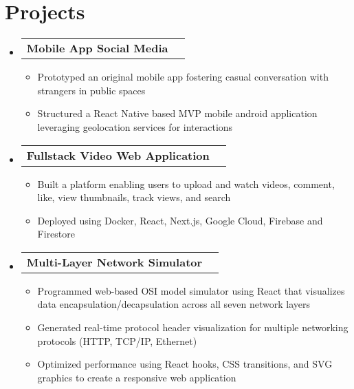 \documentclass[letterpaper,11pt]{article}
\makeatletter
\newcommand{\resumeItem}[1]{
  \item\small{#1}
    {\vspace{-2pt}}
  }
\newcommand{\resumeSubheading}[4]{
  \vspace{-2pt}\item
    \begin{tabular*}{0.97\textwidth}[t]{l@{\extracolsep{\fill}}r}
      \vspace{0pt}
      \textbf{\small#1} & \small#2 \\
      \vspace{0pt}
      \textit{\small#3} & \textit{\small #4} \\
    \end{tabular*}\vspace{-2pt}
}
\newcommand{\resumeProjectHeading}[2]{
    \item
    \begin{tabular*}{0.97\textwidth}{l@{\extracolsep{\fill}}r}
      \small#1 & \small#2 \\
    \end{tabular*}\vspace{-7pt}
}
\newcommand{\resumeSubHeadingListStart}{\begin{itemize}[leftmargin=0.15in, label={}]}
\newcommand{\resumeSubHeadingListEnd}{\end{itemize}}
\newcommand{\resumeItemListStart}{\begin{itemize}[leftmargin=*]\vspace{-2pt}}
\newcommand{\resumeItemListEnd}{\end{itemize}\vspace{-5pt}}
\makeatother
\begin{document}
\section{Projects}
    \resumeSubHeadingListStart
      \resumeProjectHeading
          {\textbf{Mobile App Social Media} \emph{}}{}
          \resumeItemListStart
            \resumeItem{Prototyped an original mobile app fostering casual conversation with strangers in public spaces}
            \resumeItem{Structured a React Native based MVP mobile android application leveraging geolocation services for interactions}
          \resumeItemListEnd
      \resumeProjectHeading
          {\textbf{Fullstack Video Web Application} \emph{}}{}
          \resumeItemListStart
            \resumeItem{Built a platform enabling users to upload and watch videos, comment, like, view thumbnails, track views, and search}
            \resumeItem{Deployed using Docker, React, Next.js, Google Cloud, Firebase and Firestore}
          \resumeItemListEnd
      \resumeProjectHeading
          {\textbf{Multi-Layer Network Simulator} \emph{}}{}
          \resumeItemListStart
            \resumeItem{Programmed web-based OSI model simulator using React that visualizes data encapsulation/decapsulation across all seven network layers}
            \resumeItem{Generated real-time protocol header visualization for multiple networking protocols (HTTP, TCP/IP, Ethernet)}
            \resumeItem{Optimized performance using React hooks, CSS transitions, and SVG graphics to create a responsive web application}
          \resumeItemListEnd
    \resumeSubHeadingListEnd



\end{document}

